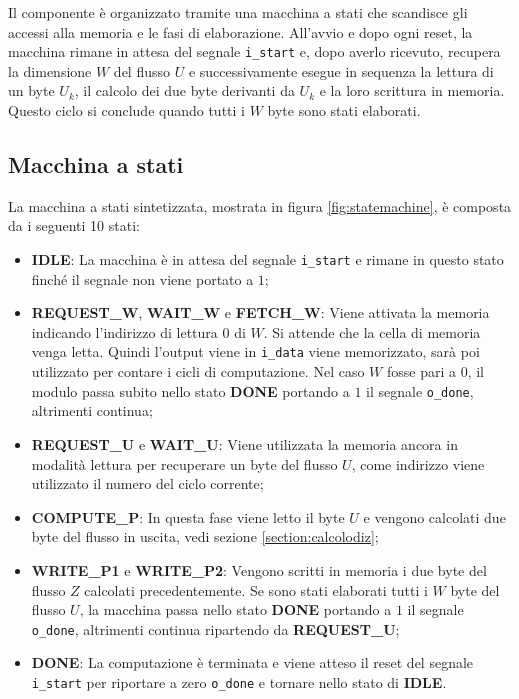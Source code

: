 Il componente è organizzato tramite una macchina a stati che scandisce gli accessi alla memoria e le fasi di elaborazione. All'avvio e dopo ogni reset, la macchina rimane in attesa del segnale \verb|i_start| e, dopo averlo ricevuto, recupera la dimensione $W$ del flusso $U$ e successivamente esegue in sequenza la lettura di un byte $U_k$, il calcolo dei due byte derivanti da $U_k$ e la loro scrittura in memoria. Questo ciclo si conclude quando tutti i $W$ byte sono stati elaborati.

\subsection{Macchina a stati}

La macchina a stati sintetizzata, mostrata in figura \ref{fig:statemachine}, è composta da i seguenti 10 stati:

\begin{itemize}
    \item \textbf{IDLE}: La macchina è in attesa del segnale \verb|i_start| e rimane in questo stato finché il segnale non viene portato a $1$;
    \item \textbf{REQUEST\_W}, \textbf{WAIT\_W} e \textbf{FETCH\_W}: Viene attivata la memoria indicando l'indirizzo di lettura $0$ di $W$. Si attende che la cella di memoria venga letta. Quindi l'output viene in \verb|i_data| viene memorizzato, sarà poi utilizzato per contare i cicli di computazione. Nel caso $W$ fosse pari a $0$, il modulo passa subito nello stato \textbf{DONE} portando a $1$ il segnale \verb|o_done|, altrimenti continua;
    \item \textbf{REQUEST\_U} e \textbf{WAIT\_U}: Viene utilizzata la memoria ancora in modalità lettura per recuperare un byte del flusso $U$, come indirizzo viene utilizzato il numero del ciclo corrente;
    \item \textbf{COMPUTE\_P}: In questa fase viene letto il byte $U$ e vengono calcolati due byte del flusso in uscita, vedi sezione \ref{section:calcolodiz};
    \item \textbf{WRITE\_P1} e \textbf{WRITE\_P2}: Vengono scritti in memoria i due byte del flusso $Z$ calcolati precedentemente. Se sono stati elaborati tutti i $W$ byte del flusso $U$, la macchina passa nello stato \textbf{DONE} portando a $1$ il segnale \verb|o_done|, altrimenti continua ripartendo da \textbf{REQUEST\_U};
    \item \textbf{DONE}: La computazione è terminata e viene atteso il reset del segnale \verb|i_start| per riportare a zero \verb|o_done| e tornare nello stato di \textbf{IDLE}.
\end{itemize}

